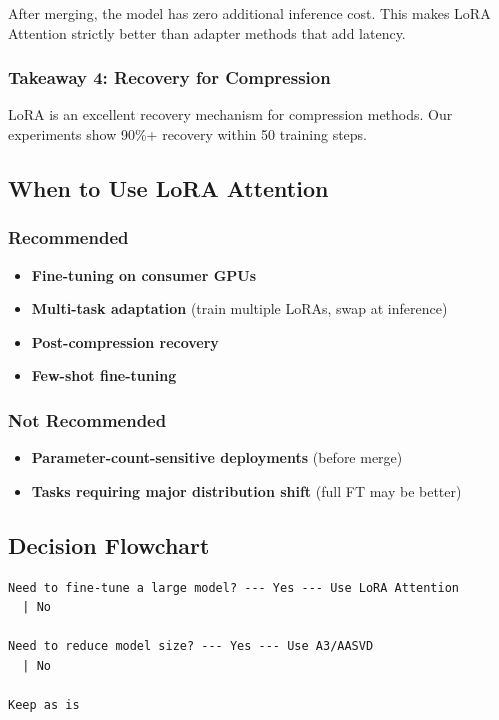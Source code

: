 After merging, the model has zero additional inference cost. This makes 
LoRA Attention strictly better than adapter methods that add latency.

\subsubsection{Takeaway 4: Recovery for Compression}

LoRA is an excellent recovery mechanism for compression methods. Our 
experiments show 90\%+ recovery within 50 training steps.

\subsection{When to Use LoRA Attention}

\subsubsection{Recommended}
\begin{itemize}
\item \textbf{Fine-tuning on consumer GPUs}
\item \textbf{Multi-task adaptation} (train multiple LoRAs, swap at inference)
\item \textbf{Post-compression recovery}
\item \textbf{Few-shot fine-tuning}

\end{itemize}
\subsubsection{Not Recommended}
\begin{itemize}
\item \textbf{Parameter-count-sensitive deployments} (before merge)
\item \textbf{Tasks requiring major distribution shift} (full FT may be better)

\end{itemize}
\subsection{Decision Flowchart}

\begin{lstlisting}
Need to fine-tune a large model? --- Yes --- Use LoRA Attention
  | No
   
Need to reduce model size? --- Yes --- Use A3/AASVD
  | No
   
Keep as is
\end{lstlisting}

